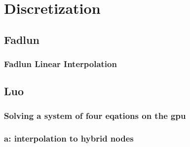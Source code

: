 \documentclass[onehalf,11pt]{beavtex}
\begin{document}








\appendix
\chapter{Discretization}
\section{Fadlun}
\subsection{Fadlun Linear Interpolation}\label{Fadlun Linear Interpolation}
\section{Luo}
\subsection{Solving a system of four eqations on the gpu}\label{system of euqations}
\subsection{a: interpolation to hybrid nodes}
\label{a: interpolation to hybrid nodes}
\end{document}
